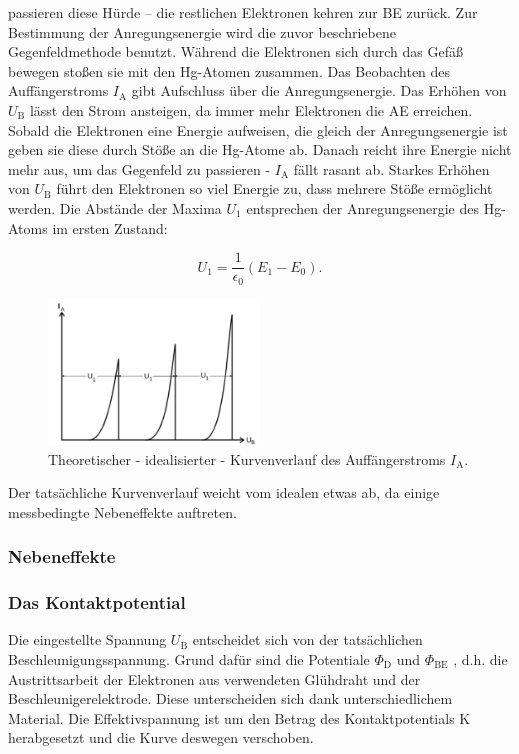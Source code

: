 passieren diese Hürde -- die restlichen Elektronen kehren zur BE zurück.
Zur Bestimmung der Anregungsenergie wird die zuvor beschriebene Gegenfeldmethode benutzt. 
Während die Elektronen sich durch das Gefäß bewegen stoßen sie mit den Hg-Atomen zusammen. 
Das Beobachten des Auffängerstroms $I_\mathup{A}$ gibt Aufschluss über die Anregungsenergie.
 Das Erhöhen von $U_\mathup{B}$ lässt den Strom ansteigen, da immer mehr Elektronen die AE erreichen.
 Sobald die Elektronen eine Energie aufweisen, die gleich der Anregungsenergie ist geben sie diese durch Stöße an die Hg-Atome ab. 
Danach reicht ihre Energie nicht mehr aus, um das Gegenfeld zu passieren - $I_\mathup{A}$ fällt rasant ab.
Starkes Erhöhen von $U_\mathup{B}$ führt den Elektronen so viel Energie zu, dass mehrere Stöße ermöglicht werden. 
Die Abstände der Maxima $U_1$ entsprechen der Anregungsenergie des Hg-Atoms im ersten Zustand:

\begin{equation}
	U_1=\frac{1}{\epsilon_0}{(E_1-E_0)}.
\end{equation}


\begin{figure}
	\includegraphics[width=0.5\textwidth]{Bilder/Kurve_Theo.pdf}
	\caption{Theoretischer - idealisierter - Kurvenverlauf des Auffängerstroms $I_\mathup{A}$.}
\end{figure}

Der tatsächliche Kurvenverlauf weicht vom idealen etwas ab, da einige messbedingte Nebeneffekte auftreten.

\subsubsection{Nebeneffekte}
\subsubsection{Das Kontaktpotential}
Die eingestellte Spannung $U_\mathup{B}$ entscheidet sich von der tatsächlichen Beschleunigungsspannung. 
Grund dafür sind die Potentiale $\Phi_\mathup{D}$ und $\Phi_\mathup{BE}$ , d.h. die Austrittsarbeit der Elektronen aus verwendeten Glühdraht und der Beschleunigerelektrode. Diese unterscheiden sich dank unterschiedlichem Material.
 Die Effektivspannung ist um den Betrag des Kontaktpotentials K herabgesetzt und die Kurve deswegen verschoben.

